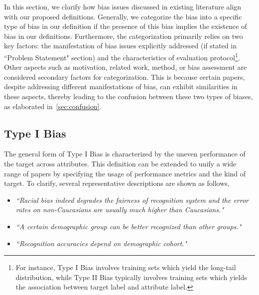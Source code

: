 \label{sec:unifying}








In this section, we clarify how bias issues discussed in existing literature align with our proposed definitions.
Generally, we categorize the bias into a specific type of bias in our definition if the presence of this bias implies the existence of bias in our definitions.
Furthermore, the categorization primarily relies on two key factors: the manifestation of bias issues explicitly addressed (if stated in ``Problem Statement" section) and the characteristics of evaluation protocol\footnote{For instance, Type I Bias involves training sets which yield the long-tail distribution, while Type II Bias typically involves training sets which yields the association between target label and attribute label.}.
Other aspects such as motivation, related work, method, or bias assessment are considered secondary factors for categorization. This is because certain papers, despite addressing different manifestations of bias, can exhibit similarities in these aspects, thereby leading to the confusion between these two types of biases, as elaborated in~\cref{sec:confusion}. 












\subsection{Type I Bias}
The general form of Type I Bias is characterized by the uneven performance of the target across attributes. This definition can be extended to unify a wide range of papers by specifying the usage of performance metrics and the kind of target.
To clarify, several representative descriptions are shown as follows, \eg

\begin{itemize}
    \item \emph{``Racial bias indeed degrades the fairness of recognition system and the error rates on non-Caucasians are usually much higher than Caucasians."}~\cite{RL_RBN}
    \item \emph{``A certain demographic group can be better recognized than other groups."}~\cite{GAC}
    \item \emph{``Recognition accuracies depend on demographic cohort."}~\cite{RFW_IMAN}
\end{itemize}

